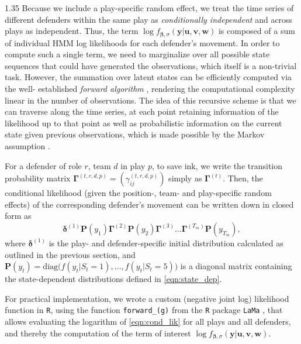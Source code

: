 \documentclass[12pt,a4paper]{article}
\newcommand{\subsubsubsectionline}[1]{\vspace{0.5em}\noindent\textit{#1}\par\vspace{0.25em}}
\begin{document}
\begin{spacing}{1.35}
Because we include a play-specific random effect, we treat the time series of different defenders within the same play as \emph{conditionally independent} and across plays as independent. Thus, the term $\log f_{\bm{\beta}, \sigma}(\bm{y} \vert \bm{u}, \bm{v}, \bm{w})$ %
is composed of a sum of individual HMM log likelihoods for each defender's movement. %
In order to compute such a single term, we need to marginalize over all possible state sequences that could have generated the observations, which itself is a non-trivial task. However, the summation over latent states can be efficiently computed via the well- established \textit{forward algorithm} \citep{zucchini, mews2025build}, rendering the computational complexity linear in the number of observations. The idea of this recursive scheme is that we can traverse along the time series, at each point retaining information of the likelihood up to that point as well as probabilistic information on the current state given previous observations, which is made possible by the Markov assumption \citep{lystig2002exact}.

For a defender %
of role $r$, team $d$ in play $p$, to save ink, we write the transition probability matrix $\bm{\Gamma}^{(t,r,d,p)} = (\gamma_{ij}^{(t,r,d,p)})$ simply as $\bm{\Gamma}^{(t)}$. 
Then, the conditional likelihood (given the position-, team- and play-specific random effects) of the corresponding defender's movement can be written down in closed form as
\begin{equation}
    \label{eqn:cond_lik}
    \bm{\delta}^{(1)} \bm{P}(y_1) \bm{\Gamma}^{(2)} \bm{P}(y_2) \bm{\Gamma}^{(3)} \dotsc \bm{\Gamma}^{(T_m)} \bm{P}(y_{T_m}),
\end{equation}
where $\bm{\delta}^{(1)}$ is the play- and defender-specific initial distribution calculated as outlined in the previous section, and $\bm{P}(y_t) = \text{diag}\bigl(f(y_t \vert S_t = 1), \dotsc, f(y_t \vert S_t = 5)\bigr)$ is a diagonal matrix containing the state-dependent distributions defined in \eqref{eqn:state_dep}.

For practical implementation, we wrote a custom (negative joint log) likelihood function in \texttt{R}, using the function \texttt{forward\_(g)} 
from the \texttt{R} package \texttt{LaMa} \citep{koslikLaMa2025}, that allows evaluating the logarithm of \eqref{eqn:cond_lik} for all plays and all defenders, and thereby the computation of the term of interest $\log f_{\bm{\beta}, \sigma}(\bm{y} \vert \bm{u}, \bm{v}, \bm{w})$.


\end{spacing}
\end{document}
